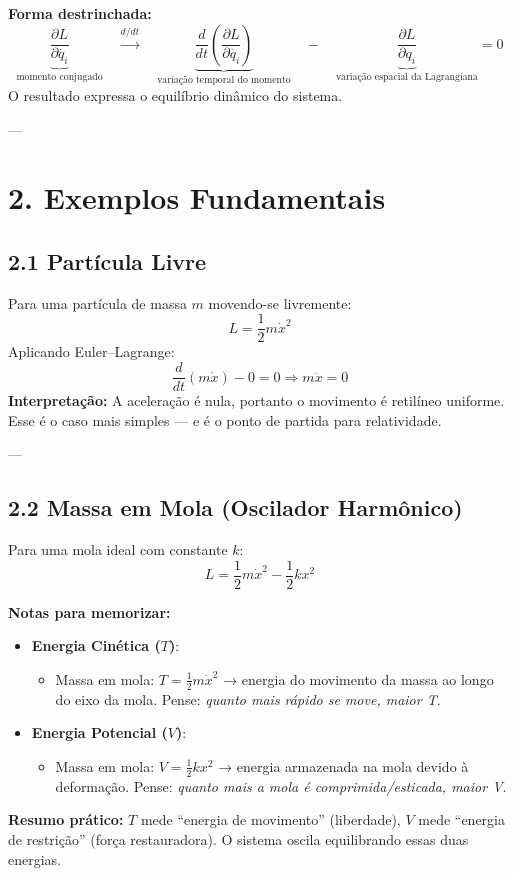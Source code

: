 \documentclass[a4paper,12pt]{article}
\begin{document}
\noindent
\textbf{Forma destrinchada:}
\[
\underbrace{\frac{\partial L}{\partial \dot{q_i}}}_{\text{momento conjugado}} 
\quad \xrightarrow{d/dt} \quad
\underbrace{\frac{d}{dt}\left( \frac{\partial L}{\partial \dot{q_i}} \right)}_{\text{variação temporal do momento}} 
\quad - \quad
\underbrace{\frac{\partial L}{\partial q_i}}_{\text{variação espacial da Lagrangiana}} = 0
\]
O resultado expressa o equilíbrio dinâmico do sistema.

---

\section*{2. Exemplos Fundamentais}

\subsection*{2.1 Partícula Livre}
Para uma partícula de massa $m$ movendo-se livremente:
\[
L = \frac{1}{2} m \dot{x}^2
\]
Aplicando Euler–Lagrange:
\[
\frac{d}{dt}\left( m \dot{x} \right) - 0 = 0 \Rightarrow m \ddot{x} = 0
\]
\textbf{Interpretação:} A aceleração é nula, portanto o movimento é retilíneo uniforme.
Esse é o caso mais simples — e é o ponto de partida para relatividade.

---

\subsection*{2.2 Massa em Mola (Oscilador Harmônico)}
Para uma mola ideal com constante $k$:
\[
L = \frac{1}{2} m \dot{x}^2 - \frac{1}{2} k x^2
\]

\textbf{Notas para memorizar:}
\begin{itemize}
    \item \textbf{Energia Cinética ($T$)}:
        \begin{itemize}
            \item Massa em mola: $T = \frac{1}{2} m \dot{x}^2$ 
                → energia do movimento da massa ao longo do eixo da mola. 
                Pense: \textit{quanto mais rápido se move, maior T}.
        \end{itemize}
    \item \textbf{Energia Potencial ($V$)}:
        \begin{itemize}
            \item Massa em mola: $V = \frac{1}{2} k x^2$ 
                → energia armazenada na mola devido à deformação. 
                Pense: \textit{quanto mais a mola é comprimida/esticada, maior V}.
        \end{itemize}
\end{itemize}
\textbf{Resumo prático:} $T$ mede “energia de movimento” (liberdade), $V$ mede “energia de restrição” (força restauradora). O sistema oscila equilibrando essas duas energias.
\end{document}
